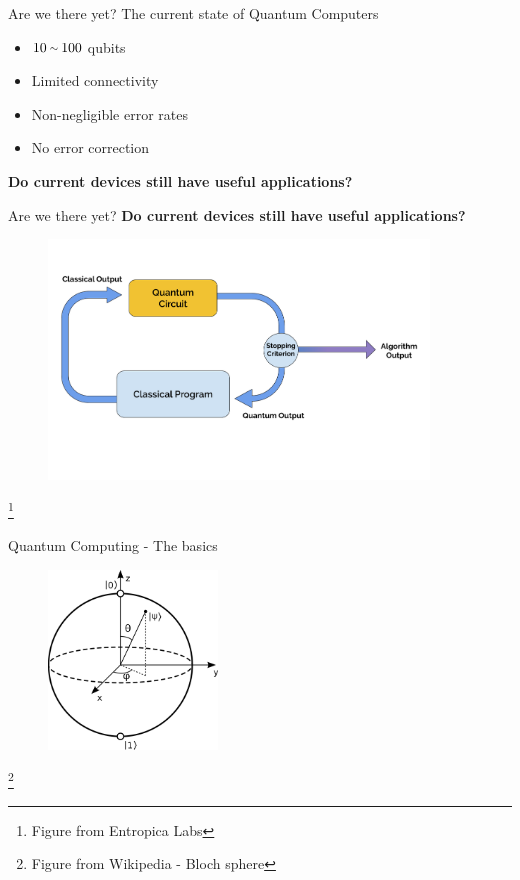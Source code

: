 \documentclass{beamer}
\newcommand\blfootnote[1]{%
	\begingroup
	\renewcommand\thefootnote{}\footnote{#1}%
	\addtocounter{footnote}{-1}%
	\endgroup
}
\begin{document}
{\begin{frame}{Are we there yet?}
The current state of Quantum Computers
\begin{itemize}
	\item $10 \: {\raise.17ex\hbox{$\scriptstyle\sim$}} \: 100$ qubits
	\item Limited connectivity
	\item Non-negligible error rates
	\item No error correction
\end{itemize}
\vspace{20px}
\pause
\textbf{Do current devices still have useful applications?}
\end{frame}

\begin{frame}{Are we there yet?}
\textbf{Do current devices still have useful applications?}
\begin{figure}
	\centering
	\includegraphics[width=0.9\textwidth]{figures/hybrid}
\end{figure}
\blfootnote{Figure from Entropica Labs}
\end{frame}


\begin{frame}{Quantum Computing - The basics}
\begin{figure}
	\centering
	\includegraphics[width=0.4\textwidth]{figures/Bloch.png}
\end{figure}
\blfootnote{Figure from Wikipedia - Bloch sphere}
\end{frame}

}
\end{document}
